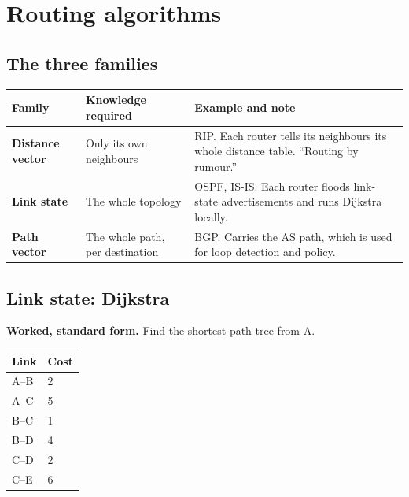 \documentclass[11pt,a4paper]{article}
\begin{document}
\section{Routing algorithms}

\subsection{The three families}

\begin{center}\small
\begin{tabularx}{\textwidth}{>{\bfseries}p{} p{} X}
\toprule Family & Knowledge required & Example and note\\
\midrule
Distance vector & Only its own neighbours & RIP. Each router tells its neighbours its whole distance table. ``Routing by rumour.''\\
Link state & The whole topology & OSPF, IS-IS. Each router floods link-state advertisements and runs Dijkstra locally.\\
Path vector & The whole path, per destination & BGP. Carries the AS path, which is used for loop detection and policy.\\
\bottomrule
\end{tabularx}
\end{center}

\subsection{Link state: Dijkstra}

\begin{pyqbox}
\textbf{Worked, standard form.} Find the shortest path tree from A.
\end{pyqbox}

\begin{center}\small
\begin{tabular}{l l}
\toprule Link & Cost\\
\midrule
A--B & 2\\
A--C & 5\\
B--C & 1\\
B--D & 4\\
C--D & 2\\
C--E & 6\\
\bottomrule
\end{tabular}
\end{center}
\end{document}
